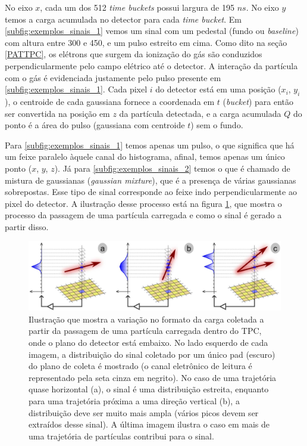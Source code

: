 \documentclass[a4paper,12pt,oneside]{book}
\begin{document}
\par No eixo $x$, cada um dos 512 \textit{time buckets} possui largura de 195 $n s$. No eixo $y$ temos a carga acumulada no detector para cada \textit{time bucket}. Em \ref{subfig:exemplos_sinais_1} vemos um sinal com um pedestal (fundo ou \textit{baseline}) com altura entre 300 e 450, e um pulso estreito em cima. Como dito na seção \ref{PATTPC}, os elétrons que surgem da ionização do gás são conduzidos perpendicularmente pelo campo elétrico até o detector. A interação da partícula com o gás é evidenciada justamente pelo pulso presente em \ref{subfig:exemplos_sinais_1}. Cada pixel $i$ do detector está em uma posição ($x_i$, $y_i$), o centroide de cada gaussiana fornece a coordenada em $t$ (\textit{bucket}) para então ser convertida na posição em $z$ da partícula detectada, e a carga acumulada $Q$ do ponto é a área do pulso (gaussiana com centroide $t$) sem o fundo.

\par Para \ref{subfig:exemplos_sinais_1} temos apenas um pulso, o que significa que há um feixe paralelo àquele canal do histograma, afinal, temos apenas um único ponto ($x$, $y$, $z$). Já para \ref{subfig:exemplos_sinais_2} temos o que é chamado de mistura de gaussianas (\textit{gaussian mixture}), que é a presença de várias gaussianas sobrepostas. Esse tipo de sinal corresponde ao feixe indo perpendicularmente ao pixel do detector. A ilustração desse processo está na figura \ref{fig:get_signal}, que mostra o processo da passagem de uma partícula carregada e como o sinal é gerado a partir disso.


\begin{figure}[H]
    \centering
    \includegraphics[scale = 0.325]{figs/get.png}
    \caption{Ilustração que mostra a variação no formato da carga coletada a partir da passagem de uma partícula carregada dentro do TPC, onde o plano do detector está embaixo. No lado esquerdo de cada imagem, a distribuição do sinal coletado por um único pad (escuro) do plano de coleta é mostrado (o canal eletrônico de leitura é representado pela seta cinza em negrito). No caso de uma trajetória quase horizontal (a), o sinal é uma distribuição estreita, enquanto para uma trajetória próxima a uma direção vertical (b), a distribuição deve ser muito mais ampla (vários picos devem ser extraídos desse sinal). A última imagem ilustra o caso em mais de uma trajetória de partículas contribui para o sinal\cite{GET}.}
    \label{fig:get_signal}
\end{figure}
\end{document}
